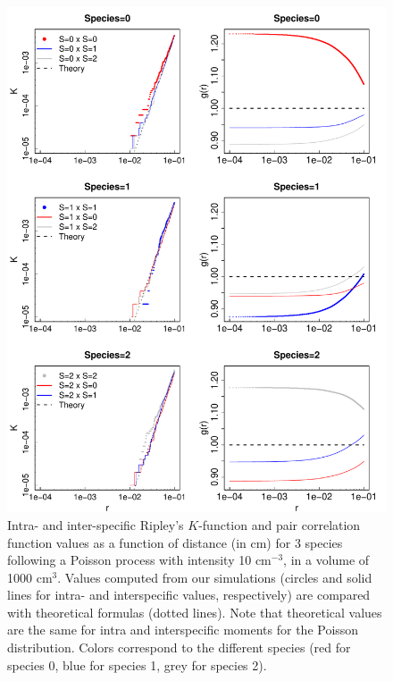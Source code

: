 \documentclass[english]{article}
\begin{document}
\begin{figure}[H]
\begin{centering}
\includegraphics[height=0.85\textheight]{../code/figure/K_PCF_Poisson}
\par\end{centering}
\caption{Intra- and inter-specific Ripley's $K$-function and pair correlation
function values as a function of distance (in cm) for 3 species following
a Poisson process with intensity 10 cm$^{-3}$, in a volume of 1000
cm$^{3}$. Values computed from our simulations (circles and solid
lines for intra- and interspecific values, respectively) are compared
with theoretical formulas (dotted lines). Note that theoretical values
are the same for intra and interspecific moments for the Poisson distribution.
Colors correspond to the different species (red for species 0, blue
for species 1, grey for species 2). }
\end{figure}
\end{document}
